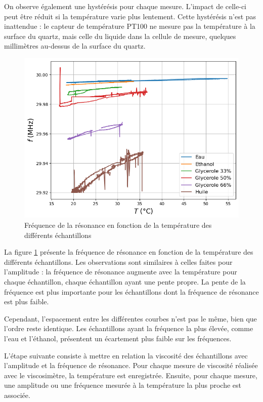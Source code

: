 On observe également une hystérésis pour chaque mesure. L'impact de celle-ci peut être réduit si la température varie plus lentement.  
Cette hystérésis n'est pas inattendue : le capteur de température PT100 ne mesure pas la température à la surface du quartz, mais celle du liquide dans la cellule de mesure, quelques millimètres au-dessus de la surface du quartz.

\begin{figure}[H]
    \centering
    \includegraphics[width=\textwidth]{assets/figures/Frequ-Temperature.png}
    \caption{Fréquence de la résonance en fonction de la température des différents échantillons}
    \label{fig:Frequence VS Température}
\end{figure}

La figure \ref{fig:Frequence VS Température} présente la fréquence de résonance en fonction de la température des différents échantillons.  
Les observations sont similaires à celles faites pour l'amplitude : la fréquence de résonance augmente avec la température pour chaque échantillon, chaque échantillon ayant une pente propre.  
La pente de la fréquence est plus importante pour les échantillons dont la fréquence de résonance est plus faible.

Cependant, l'espacement entre les différentes courbes n'est pas le même, bien que l'ordre reste identique.  
Les échantillons ayant la fréquence la plus élevée, comme l'eau et l'éthanol, présentent un écartement plus faible sur les fréquences.

L’étape suivante consiste à mettre en relation la viscosité des échantillons avec l’amplitude et la fréquence de résonance.  
Pour chaque mesure de viscosité réalisée avec le viscosimètre, la température est enregistrée. Ensuite, pour chaque mesure, une amplitude ou une fréquence mesurée à la température la plus proche est associée.

